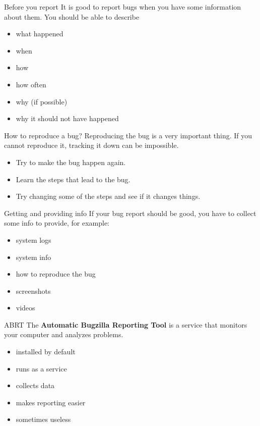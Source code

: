 \documentclass[12pt]{beamer}
\begin{document}
\begin{frame}{Before you report}
It is good to report bugs when you have some information about them. You should be able to describe

\begin{itemize}
	\item what happened
	\item when 
	\item how 
	\item how often
	\item why (if possible)
	\item why it should not have happened
\end{itemize}	
\end{frame}

\begin{frame}{How to reproduce a bug?}
	Reproducing the bug is a very important thing. If you cannot reproduce it, tracking it down can be impossible.
	\begin{itemize}
		\item Try to make the bug happen again.
		\item Learn the steps that lead to the bug.
		\item Try changing some of the steps and see if it changes things.
	\end{itemize}
\end{frame}

\begin{frame}{Getting and providing info}
If your bug report should be good, you have to collect some info to provide, for example:
\begin{itemize}
	\item system logs
	\item system info
	\item how to reproduce the bug
	\item screenshots
	\item videos
\end{itemize}
\end{frame}

\begin{frame}{ABRT}
The \textbf{Automatic Bugzilla Reporting Tool} is a service that monitors your computer and analyzes problems.
\begin{itemize}
	\item installed by default
	\item runs as a service
	\item collects data
	\item makes reporting easier
	\item sometimes useless
\end{itemize}
\end{frame}
\end{document}
